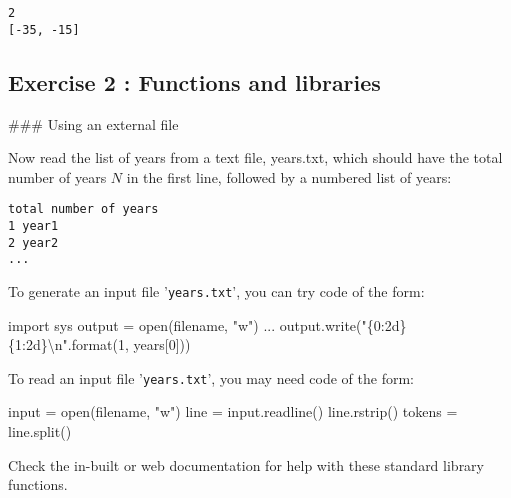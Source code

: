 \documentclass[11pt]{article}
\newenvironment{Shaded}{}{}
\newcommand{\DecValTok}[1]{\textcolor[rgb]{0.25,0.63,0.44}{{#1}}}
\newcommand{\CharTok}[1]{\textcolor[rgb]{0.25,0.44,0.63}{{#1}}}
\newcommand{\StringTok}[1]{\textcolor[rgb]{0.25,0.44,0.63}{{#1}}}
\newcommand{\NormalTok}[1]{{#1}}
\newcommand{\SpecialCharTok}[1]{\textcolor[rgb]{0.25,0.44,0.63}{{#1}}}
\newcommand{\ImportTok}[1]{{#1}}
\newcommand{\OperatorTok}[1]{\textcolor[rgb]{0.40,0.40,0.40}{{#1}}}
\newcommand{\BuiltInTok}[1]{{#1}}
\begin{document}
    \begin{Verbatim}[commandchars=\\\{\}]
2
[-35, -15]

    \end{Verbatim}

    \subsection{Exercise 2 : Functions and
libraries}\label{exercise-2-functions-and-libraries}

 \#\#\# Using an external file

Now read the list of years from a text file, years.txt, which should
have the total number of years \(N\) in the first line, followed by a
numbered list of years:

\begin{verbatim}
total number of years
1 year1
2 year2
...
\end{verbatim}

To generate an input file '\texttt{years.txt}', you can try code of the
form:

\begin{Shaded}
\begin{Highlighting}[]
\ImportTok{import} \NormalTok{sys}
\NormalTok{output }\OperatorTok{=} \BuiltInTok{open}\NormalTok{(filename, }\StringTok{"w"}\NormalTok{)}
\NormalTok{...}
\NormalTok{output.write(}\StringTok{"}\SpecialCharTok{\{0:2d\}}\StringTok{ }\SpecialCharTok{\{1:2d\}}\CharTok{\textbackslash{}n}\StringTok{"}\NormalTok{.}\BuiltInTok{format}\NormalTok{(}\DecValTok{1}\NormalTok{, years[}\DecValTok{0}\NormalTok{]))}
\end{Highlighting}
\end{Shaded}

To read an input file '\texttt{years.txt}', you may need code of the
form:

\begin{Shaded}
\begin{Highlighting}[]
\BuiltInTok{input} \OperatorTok{=} \BuiltInTok{open}\NormalTok{(filename, }\StringTok{"w"}\NormalTok{)}
\NormalTok{line }\OperatorTok{=} \BuiltInTok{input}\NormalTok{.readline()}
\NormalTok{line.rstrip()}
\NormalTok{tokens }\OperatorTok{=} \NormalTok{line.split()}
\end{Highlighting}
\end{Shaded}

Check the in-built or web documentation for help with these standard
library functions.
\end{document}
